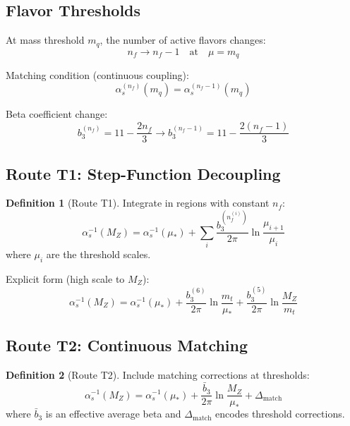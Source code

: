 \documentclass[11pt,a4paper]{article}
\theoremstyle{definition}
\newtheorem{definition}{Definition}[section]
\begin{document}
\subsection{Flavor Thresholds}
\label{subsec:flavor-thresholds}

At mass threshold $m_q$, the number of active flavors changes:
\begin{equation}
\label{eq:nf-change}
n_f \to n_f - 1 \quad \text{at} \quad \mu = m_q
\end{equation}

Matching condition (continuous coupling):
\begin{equation}
\label{eq:threshold-match}
\alpha_s^{(n_f)}(m_q) = \alpha_s^{(n_f-1)}(m_q)
\end{equation}

Beta coefficient change:
\begin{equation}
\label{eq:beta-change}
b_3^{(n_f)} = 11 - \frac{2n_f}{3} \to b_3^{(n_f-1)} = 11 - \frac{2(n_f-1)}{3}
\end{equation}

\subsection{Route T1: Step-Function Decoupling}
\label{subsec:route-t1}

\begin{definition}[Route T1]
Integrate in regions with constant $n_f$:
\begin{equation}
\label{eq:t1-formula}
\alpha_s^{-1}(M_Z) = \alpha_s^{-1}(\mu_*) + \sum_{i} \frac{b_3^{(n_f^{(i)})}}{2\pi}
  \ln\frac{\mu_{i+1}}{\mu_i}
\end{equation}
where $\mu_i$ are the threshold scales.
\end{definition}

Explicit form (high scale to $M_Z$):
\begin{equation}
\label{eq:t1-explicit}
\alpha_s^{-1}(M_Z) = \alpha_s^{-1}(\mu_*) + \frac{b_3^{(6)}}{2\pi}\ln\frac{m_t}{\mu_*}
  + \frac{b_3^{(5)}}{2\pi}\ln\frac{M_Z}{m_t}
\end{equation}

\subsection{Route T2: Continuous Matching}
\label{subsec:route-t2}

\begin{definition}[Route T2]
Include matching corrections at thresholds:
\begin{equation}
\label{eq:t2-formula}
\alpha_s^{-1}(M_Z) = \alpha_s^{-1}(\mu_*) + \frac{\bar{b}_3}{2\pi}\ln\frac{M_Z}{\mu_*}
  + \Delta_{\text{match}}
\end{equation}
where $\bar{b}_3$ is an effective average beta and $\Delta_{\text{match}}$ encodes
threshold corrections.
\end{definition}
\end{document}
